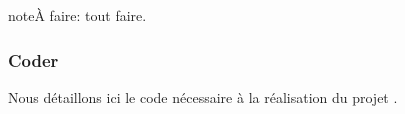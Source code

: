 \documentclass[letterpaper,10pt,french]{sphinxmanual}
\begin{document}
\begin{sphinxadmonition}{note}{\label{projets/galton-fabriquer:index-0}À faire:}
tout faire.
\end{sphinxadmonition}

\ignorespaces 

\subsubsection{Coder}
\label{\detokenize{projets/galton-coder:index-0}}\label{\detokenize{projets/galton-coder:coder}}\label{\detokenize{projets/galton-coder::doc}}
Nous détaillons ici le code nécessaire à la réalisation
du projet {\hyperref[\detokenize{projets/galton:projetgalton}]{}}.
\end{document}
